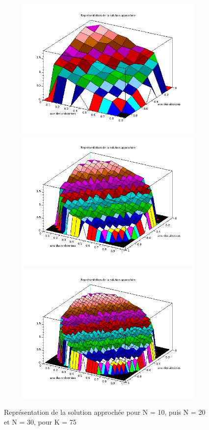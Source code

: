 \documentclass[12pt, a4paper]{article}
\begin{document}
\begin{figure}[p]
    \begin{center}
        \caption{Représentation de la solution approchée pour N = 10, puis N = 20 et N = 30, pour K
        = 75}
        \includegraphics[width=13cm,height=7cm]{ResultatsConvergences/ImageK5S25N10.png}
        \includegraphics[width=13cm,height=7cm]{ResultatsConvergences/ImageK5S25N20.png}
        \includegraphics[width=13cm,height=7cm]{ResultatsConvergences/ImageK5S25N30.png}
        \label{image75}
    \end{center}
\end{figure}
\end{document}
